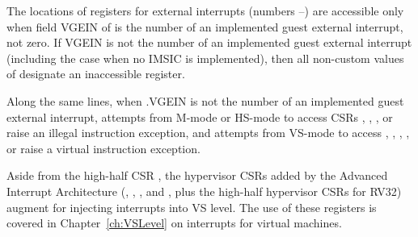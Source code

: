 The locations of registers for external interrupts (numbers
--) are accessible only when field VGEIN of 
is the number of an implemented guest external interrupt, not zero.
If VGEIN is not the number of an implemented guest external interrupt
(including the case when no IMSIC is implemented), then all non-custom
values of  designate an inaccessible register.

Along the same lines, when .VGEIN is not the number of
an implemented guest external interrupt, attempts from \mbox{M-mode}
or \mbox{HS-mode} to access CSRs , ,
, or  raise an illegal instruction
exception, and attempts from \mbox{VS-mode} to access ,
, , , or  raise a
virtual instruction exception.

Aside from the high-half CSR , the hypervisor CSRs added
by the Advanced Interrupt Architecture (, ,
, and , plus the high-half hypervisor CSRs for
RV32) augment  for injecting interrupts into VS level.
The use of these registers is covered in Chapter~\ref{ch:VSLevel} on
interrupts for virtual machines.

